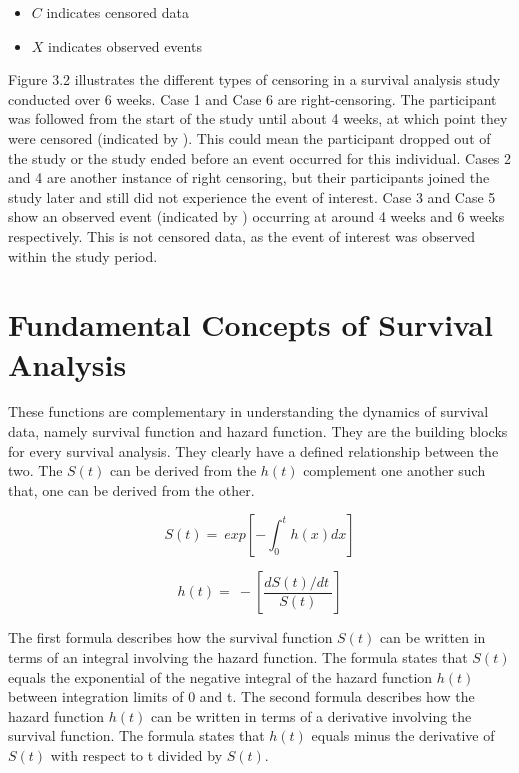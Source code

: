 \documentclass[doublespacing]{report} %
\begin{document}
\begin{itemize}

\item \(C\) indicates censored data
\item  \(X\) indicates observed events


\end{itemize}

Figure 3.2 illustrates the different types of censoring in a survival analysis study conducted over 6 weeks. Case 1 and Case 6 are right-censoring. The participant was followed from the start of the study until about 4 weeks, at which point they were censored (indicated by ). This could mean the participant dropped out of the study or the study ended before an event occurred for this individual. Cases 2 and 4 are another instance of right censoring, but their participants joined the study later and still did not experience the event of interest. Case 3 and Case 5 show an observed event (indicated by ) occurring at around 4 weeks and 6 weeks respectively. This is not censored data, as the event of interest was observed within the study period.

\section{Fundamental Concepts of Survival Analysis}

These functions are complementary in understanding the dynamics of survival data, namely survival function and hazard function. They are the building blocks for every survival analysis. They clearly have a defined relationship between the two. The \(S\left(t\right)\) can be derived from the \(h\left(t\right)\) complement one another such that, one can be derived from the other.

\[S\left(t\right)=\ exp\left[-\int_{0}^{t}{h(x)dx}\right]\]

\[h\left(t\right)=\ -\left[\frac{dS\left(t\right)/dt\ }{S(t)}\right]\]



The first formula describes how the survival function \(S\left(t\right)\) can be written in terms of an integral involving the hazard function. The formula states that \(S\left(t\right) \)equals the exponential of the negative integral of the hazard function \(h\left(t\right) \) between integration limits of 0 and t. 
The second formula describes how the hazard function \(h\left(t\right) \) can be written in terms of a derivative involving the survival function. The formula states that \( h\left(t\right)\) equals minus the derivative of \(S\left(t\right) \) with respect to t divided by \(S\left(t\right)\).
\end{document}
